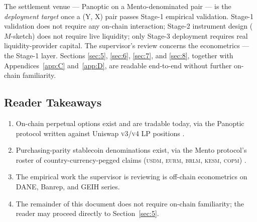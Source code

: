 The settlement venue --- Panoptic on a Mento-denominated pair --- is the
\emph{deployment target} once a (Y, X) pair passes Stage-1 empirical
validation. Stage-1 validation does not require any on-chain interaction;
Stage-2 instrument design (\(M\)-sketch) does not require live liquidity;
only Stage-3 deployment requires real liquidity-provider capital. The
supervisor's review concerns the econometrics --- the Stage-1 layer. Sections
\ref{sec:5}, \ref{sec:6}, \ref{sec:7}, and \ref{sec:8}, together with
Appendices~\ref{app:C} and~\ref{app:D}, are readable end-to-end without
further on-chain familiarity.

\subsection{Reader Takeaways}\label{sec:4-takeaways}

\begin{enumerate}
  \item On-chain perpetual options exist and are tradable today, via the
        Panoptic protocol written against Uniswap \textsc{v3}/\textsc{v4} LP
        positions \citep{panoptic_docs_2026}.
  \item Purchasing-parity stablecoin denominations exist, via the Mento
        protocol's roster of country-currency-pegged claims
        (\textsc{usdm}, \textsc{eurm}, \textsc{brlm}, \textsc{kesm},
        \textsc{copm}) \citep{mento_v3_deployments_2026}.
  \item The empirical work the supervisor is reviewing is off-chain
        econometrics on DANE, Banrep, and GEIH series.
  \item The remainder of this document does not require on-chain familiarity;
        the reader may proceed directly to Section~\ref{sec:5}.
\end{enumerate}
